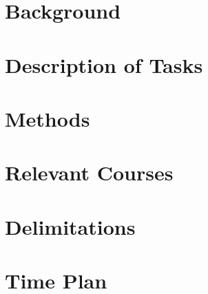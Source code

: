 \documentclass{article}
\begin{document}
\section{Background}
\section{Description of Tasks}
\section{Methods}
\section{Relevant Courses}
\section{Delimitations}
\section{Time Plan}
\end{document}
